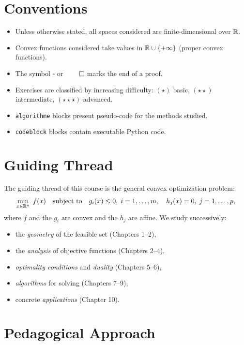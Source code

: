 \section*{Conventions}

\begin{itemize}
    \item Unless otherwise stated, all spaces considered are finite-dimensional over $\mathbb{R}$.
    \item Convex functions considered take values in $\mathbb{R} \cup \{+\infty\}$
          (proper convex functions).
    \item The symbol $\square$ or $\qed$ marks the end of a proof.
    \item Exercises are classified by increasing difficulty:
          $(\star)$ basic, $(\star\star)$ intermediate, $(\star\star\star)$ advanced.
    \item \texttt{algorithme} blocks present pseudo-code for the methods studied.
    \item \texttt{codeblock} blocks contain executable Python code.
\end{itemize}

\section*{Guiding Thread}

The guiding thread of this course is the general convex optimization problem:
\[
    \min_{x \in \mathbb{R}^n} \; f(x) \quad \text{subject to} \quad
    g_i(x) \leq 0, \; i=1,\ldots,m, \quad
    h_j(x) = 0, \; j=1,\ldots,p,
\]
where $f$ and the $g_i$ are convex and the $h_j$ are affine. We study successively:
\begin{itemize}
    \item the \emph{geometry} of the feasible set (Chapters 1--2),
    \item the \emph{analysis} of objective functions (Chapters 2--4),
    \item \emph{optimality conditions} and \emph{duality} (Chapters 5--6),
    \item \emph{algorithms} for solving (Chapters 7--9),
    \item concrete \emph{applications} (Chapter 10).
\end{itemize}

\section*{Pedagogical Approach}

